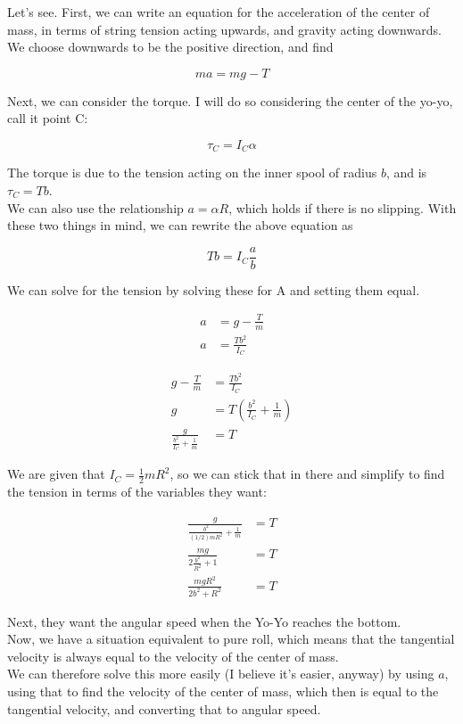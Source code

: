 \documentclass[8.01x]{subfiles}
\begin{document}
Let's see. First, we can write an equation for the acceleration of the center of mass, in terms of string tension acting upwards, and gravity acting downwards. We choose downwards to be the positive direction, and find

\begin{equation}
m a = m g - T
\end{equation}

Next, we can consider the torque. I will do so considering the center of the yo-yo, call it point C:

\begin{equation}
\tau_C = I_C \alpha
\end{equation}

The torque is due to the tension acting on the inner spool of radius $b$, and is $\tau_C = T b$.\\
We can also use the relationship $a = \alpha R$, which holds if there is no slipping. With these two things in mind, we can rewrite the above equation as

\begin{equation}
T b = I_C \frac{a}{b}
\end{equation}

We can solve for the tension by solving these for A and setting them equal.

\begin{align}
a &= g - \frac{T}{m}\\
a &= \frac{T b^2}{I_C}
\end{align}

\begin{align}
g - \frac{T}{m} &= \frac{T b^2}{I_C}\\
g &= T\left(\frac{b^2}{I_C} + \frac{1}{m}\right)\\
\frac{g}{\frac{b^2}{I_C} + \frac{1}{m}} &= T
\end{align}

We are given that $I_C = \frac{1}{2} m R^2$, so we can stick that in there and simplify to find the tension in terms of the variables they want:

\begin{align}
\frac{g}{\frac{b^2}{(1/2) m R^2} + \frac{1}{m}} &= T\\
\frac{m g}{2 \frac{b^2}{R^2} + 1} &= T\\
\frac{m g R^2}{2 b^2 + R^2} &= T
\end{align}

Next, they want the angular speed when the Yo-Yo reaches the bottom.\\
Now, we have a situation equivalent to pure roll, which means that the tangential velocity is always equal to the velocity of the center of mass.\\
We can therefore solve this more easily (I believe it's easier, anyway) by using $a$, using that to find the velocity of the center of mass, which then is equal to the tangential velocity, and converting that to angular speed.
\end{document}
